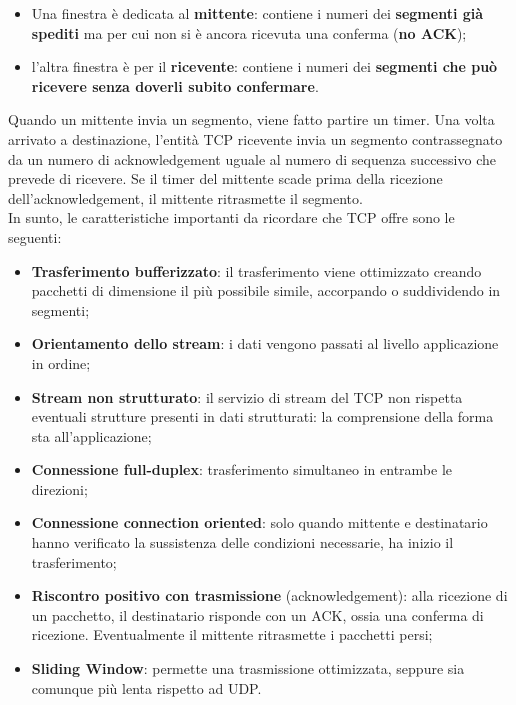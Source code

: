         \begin{itemize}
            \item Una finestra è dedicata al \textbf{mittente}: contiene i numeri dei \textbf{segmenti già spediti} ma per
            cui non si è ancora ricevuta una conferma (\textbf{no ACK});
            \item l’altra finestra è per il \textbf{ricevente}: contiene i numeri dei \textbf{segmenti che può ricevere
        senza doverli subito confermare}.
        \end{itemize}
        
        Quando un mittente invia un segmento, viene fatto partire un timer. Una volta arrivato a
        destinazione, l’entità TCP ricevente invia un segmento contrassegnato da un numero di
        acknowledgement uguale al numero di sequenza successivo che prevede di ricevere. Se il timer
        del mittente scade prima della ricezione dell’acknowledgement, il mittente ritrasmette il
        segmento.\\

        In sunto, le caratteristiche importanti da ricordare che TCP offre sono le seguenti:
        \begin{itemize}
            \item \textbf{Trasferimento bufferizzato}: il trasferimento viene ottimizzato creando pacchetti di
            dimensione il più possibile simile, accorpando o suddividendo in segmenti;
            \item \textbf{Orientamento dello stream}: i dati vengono passati al livello applicazione in ordine;
            \item \textbf{Stream non strutturato}: il servizio di stream del TCP non rispetta eventuali strutture
            presenti in dati strutturati: la comprensione della forma sta all’applicazione;
            \item \textbf{Connessione full-duplex}: trasferimento simultaneo in entrambe le direzioni;
            \item \textbf{Connessione connection oriented}: solo quando mittente e destinatario hanno
            verificato la sussistenza delle condizioni necessarie, ha inizio il trasferimento;
            \item \textbf{Riscontro positivo con trasmissione} (acknowledgement): alla ricezione di un
            pacchetto, il destinatario risponde con un ACK, ossia una conferma di ricezione.
            Eventualmente il mittente ritrasmette i pacchetti persi;
            \item \textbf{Sliding Window}: permette una trasmissione ottimizzata, seppure sia comunque più
            lenta rispetto ad UDP.
        \end{itemize}